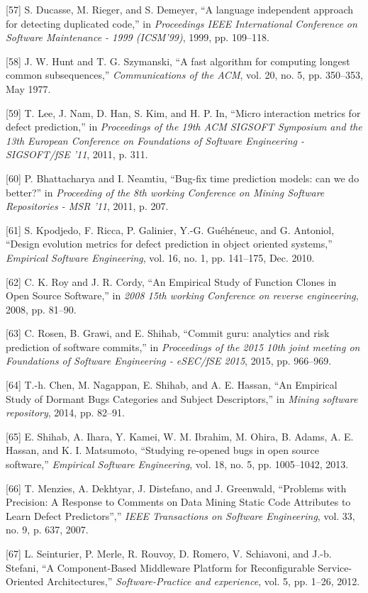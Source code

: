 {[}57{]} S. Ducasse, M. Rieger, and S. Demeyer, ``A language independent
approach for detecting duplicated code,'' in \emph{Proceedings IEEE
International Conference on Software Maintenance - 1999 (ICSM'99)}, 1999,
pp. 109--118.

{[}58{]} J. W. Hunt and T. G. Szymanski, ``A fast algorithm for
computing longest common subsequences,'' \emph{Communications of the
ACM}, vol. 20, no. 5, pp. 350--353, May 1977.

{[}59{]} T. Lee, J. Nam, D. Han, S. Kim, and H. P. In, ``Micro
interaction metrics for defect prediction,'' in \emph{Proceedings of the
19th ACM SIGSOFT Symposium and the 13th European Conference on
Foundations of Software Engineering - SIGSOFT/fSE '11}, 2011, p. 311.

{[}60{]} P. Bhattacharya and I. Neamtiu, ``Bug-fix time prediction
models: can we do better?'' in \emph{Proceeding of the 8th working
Conference on Mining Software Repositories - MSR '11}, 2011, p. 207.

{[}61{]} S. Kpodjedo, F. Ricca, P. Galinier, Y.-G. Gu{é}h{é}neuc, and G.
Antoniol, ``Design evolution metrics for defect prediction in object
oriented systems,'' \emph{Empirical Software Engineering}, vol. 16, no.
1, pp. 141--175, Dec. 2010.

{[}62{]} C. K. Roy and J. R. Cordy, ``An Empirical Study of Function
Clones in Open Source Software,'' in \emph{2008 15th working Conference
on reverse engineering}, 2008, pp. 81--90.

{[}63{]} C. Rosen, B. Grawi, and E. Shihab, ``Commit guru: analytics and
risk prediction of software commits,'' in \emph{Proceedings of the 2015
10th joint meeting on Foundations of Software Engineering - eSEC/fSE
2015}, 2015, pp. 966--969.

{[}64{]} T.-h. Chen, M. Nagappan, E. Shihab, and A. E. Hassan, ``An
Empirical Study of Dormant Bugs Categories and Subject Descriptors,'' in
\emph{Mining software repository}, 2014, pp. 82--91.

{[}65{]} E. Shihab, A. Ihara, Y. Kamei, W. M. Ibrahim, M. Ohira, B.
Adams, A. E. Hassan, and K. I. Matsumoto, ``Studying re-opened bugs in
open source software,'' \emph{Empirical Software Engineering}, vol. 18,
no. 5, pp. 1005--1042, 2013.

{[}66{]} T. Menzies, A. Dekhtyar, J. Distefano, and J. Greenwald,
``Problems with Precision: A Response to Comments on Data Mining Static Code Attributes to Learn Defect Predictors'','' \emph{IEEE Transactions on Software Engineering}, vol. 33, no. 9, p. 637, 2007.

{[}67{]} L. Seinturier, P. Merle, R. Rouvoy, D. Romero, V. Schiavoni,
and J.-b. Stefani, ``A Component-Based Middleware Platform for
Reconfigurable Service-Oriented Architectures,'' \emph{Software-Practice
and experience}, vol. 5, pp. 1--26, 2012.

